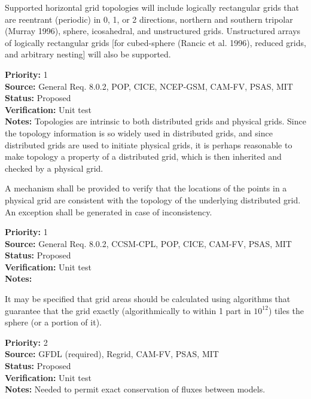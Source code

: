  Supported horizontal grid topologies will include
logically rectangular grids that are reentrant (periodic) in 0, 1, or 2 directions,
northern and southern tripolar (Murray 1996), sphere, icosahedral, and unstructured
grids.  Unstructured arrays of logically rectangular grids [for cubed-sphere (Rancic
et al. 1996), reduced grids, and arbitrary nesting] will also be supported.
\begin{reqlist}
{\bf Priority:} 1 \\
{\bf Source:} General Req. 8.0.2, POP, CICE, NCEP-GSM,
CAM-FV, PSAS, MIT  \\
{\bf Status:} Proposed \\
{\bf Verification:} Unit test\\
{\bf Notes:}  Topologies are intrinsic to both distributed grids and physical grids.  Since
the topology information is so widely used in distributed grids, and since distributed grids
are used to initiate physical grids, it is perhaps reasonable to make topology a
property of a distributed grid, which is then inherited and checked by a physical grid.
\end{reqlist}

A mechanism shall be provided to verify that the locations of the points in
a physical grid are consistent with the topology of the underlying distributed grid.  An
exception shall be generated in case of inconsistency.
\begin{reqlist}
{\bf Priority:} 1 \\
{\bf Source:} General Req. 8.0.2, CCSM-CPL, POP, CICE, 
CAM-FV, PSAS, MIT  \\
{\bf Status:} Proposed \\
{\bf Verification:} Unit test\\
{\bf Notes:}
\end{reqlist}

It may be specified that grid areas should be calculated using algorithms that
guarantee that the grid exactly (algorithmically to within 1 part in $10^{12}$) tiles
the sphere (or a portion of it). 
\begin{reqlist}
{\bf Priority:} 2 \\
{\bf Source:} GFDL (required), Regrid, 
CAM-FV, PSAS, MIT  \\
{\bf Status:} Proposed \\
{\bf Verification:} Unit test\\
{\bf Notes:} Needed to permit exact conservation of fluxes between models.
\end{reqlist}


